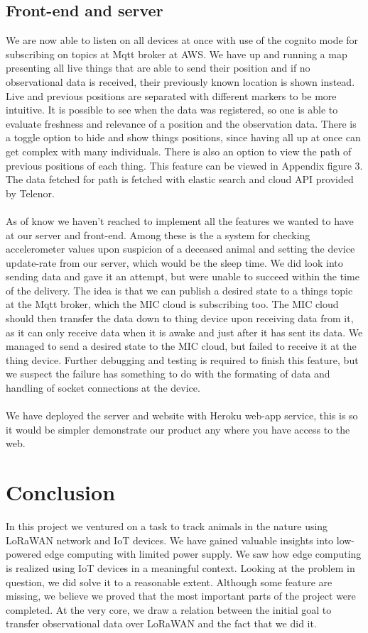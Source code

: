 		\subsection{Front-end and server}
		We are now able to listen on all devices at once with use of the cognito mode for subscribing on topics at Mqtt broker at AWS. We have up and running a map presenting all live things that are able to send their position and if no observational data is received, their previously known location is shown instead. Live and previous positions are separated with different markers to be more intuitive. It is possible to see when the data was registered, so one is able to evaluate freshness and relevance of a position and the observation data. There is a toggle option to hide and show things positions, since having all up at once can get complex with many individuals. There is also an option to view the path of previous positions of each thing. This feature can be viewed in Appendix figure 3. The data fetched for path is fetched with elastic search and cloud API provided by Telenor. \\\\
		As of know we haven't reached to implement all the features we wanted to have at our server and front-end. Among these is the a system for checking accelerometer values upon suspicion of a deceased animal and setting the device update-rate from our server, which would be the sleep time. We did look into sending data and gave it an attempt, but were unable to succeed within the time of the delivery. The idea is that we can publish a desired state to a things topic at the Mqtt broker, which the MIC cloud is subscribing too. The MIC cloud should then transfer the data down to thing device upon receiving data from it, as it can only receive data when it is awake and just after it has sent its data. We managed to send a desired state to the MIC cloud, but failed to receive it at the thing device. Further debugging and testing is required to finish this feature, but we suspect the failure has something to do with the formating of data and handling of socket connections at the device.\\\\
		We have deployed the server and website with Heroku web-app service, this is so it would be simpler demonstrate our product any where you have access to the web.  
\section{Conclusion}
	In this project we ventured on a task to track animals in the nature using LoRaWAN network and IoT devices. We have gained valuable insights into low-powered edge computing with limited power supply. We saw how edge computing is realized using IoT devices in a meaningful context. Looking  at the problem in question, we did solve it to a reasonable extent. Although some feature are missing, we believe we proved that the most important parts of the project were completed. At the very core, we draw a relation between the initial goal to transfer observational data over LoRaWAN and the fact that we did it. 

